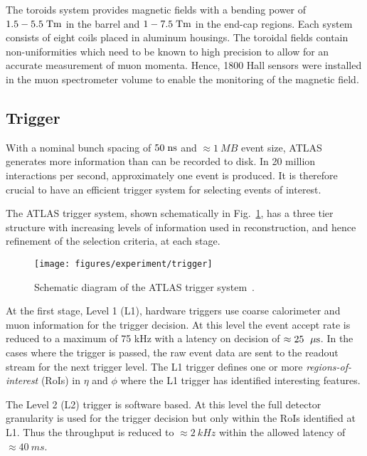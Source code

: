The toroids system provides magnetic fields with a bending power
of \mbox{$1.5 - 5.5 \; \mathrm{Tm}$} in the barrel and \mbox{$1 - 7.5 \; \mathrm{Tm}$} in the end-cap regions.
Each system consists of eight coils placed in aluminum housings.
The toroidal fields contain non-uniformities which need to be known to
high precision to allow for an accurate measurement of muon momenta.
Hence, 1800 Hall sensors were installed in the muon spectrometer 
volume to enable the monitoring of the magnetic field.


\subsection{Trigger}
\label{sec:triggerDAQ}

With a nominal bunch spacing of \mbox{$50 \; \mathrm{ns}$} and
\mbox{$\approx{}1~MB$} event size, ATLAS generates more
information than can be recorded to disk. In 20 million 
interactions per second, approximately one \ttbar{} event 
is produced. It is therefore crucial to have an efficient trigger
system for selecting events of interest.

The ATLAS trigger system, shown schematically in
Fig.~\ref{fig:trigger}, has a three tier structure with increasing
levels of information used in reconstruction, and hence refinement of
the selection criteria, at each stage.

\begin{figure}[ht]
\begin{center}
\texttt{[image: figures/experiment/trigger]}
\caption[ATLAS trigger system]{
  Schematic diagram of the ATLAS trigger system~\cite{trigger}. }
\label{fig:trigger}
\end{center}
\end{figure}

At the first stage, Level 1 (L1), hardware triggers use coarse
calorimeter and muon information for the trigger decision. At this
level the event accept rate is reduced to a maximum of 75 kHz with a
latency on decision of $\approx{}25~\; \mu\mathrm{s}{}$. In the cases where the
trigger is passed, the raw event data are sent to the readout stream
for the next trigger level. The L1 trigger defines one or more
\emph{regions-of-interest} (RoIs) in $\eta{}$ and $\phi{}$ where the
L1 trigger has identified interesting features. 

The Level 2 (L2) trigger is software based. At this level the full detector
granularity is used for the trigger decision but only within the RoIs
identified at L1. Thus the throughput is reduced to
$\approx{}2~kHz$ within the allowed latency of $\approx{}40~ms$.


